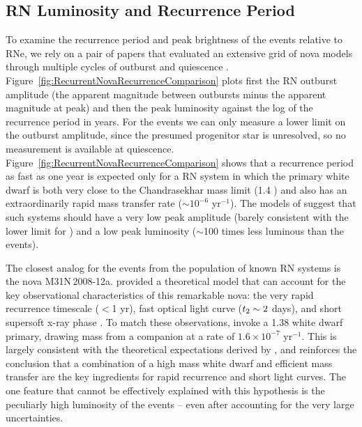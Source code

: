 \subsection{RN Luminosity and Recurrence Period}\label{sec:RNLuminosityRecurrence}

To examine the recurrence period and peak brightness of the \spock
events relative to RNe, we rely on a pair of papers that evaluated an
extensive grid of nova models through multiple cycles of outburst and
quiescence \citep{Prialnik:1995,Yaron:2005}.
Figure~\ref{fig:RecurrentNovaRecurrenceComparison} plots first the RN
outburst amplitude (the apparent magnitude between outbursts minus the
apparent magnitude at peak) and then the peak luminosity against the
log of the recurrence period in years.
For the \spock events we can only measure a lower limit on the
outburst amplitude, since the presumed progenitor star is unresolved,
so no measurement is available at
quiescence. Figure~\ref{fig:RecurrentNovaRecurrenceComparison} shows
that a recurrence period as fast as one year is expected only for a RN
system in which the primary white dwarf is both very close to the Chandrasekhar
mass limit (1.4 \Msun) and also has an extraordinarily rapid mass
transfer rate ($\sim10^{-6}$ \Msun yr$^{-1}$).  The models of
\citet{Yaron:2005} suggest that such systems should have a very low
peak amplitude (barely consistent with the lower limit for \spock) and
a low peak luminosity ($\sim$100 times less luminous than the \spock
events).

The closest analog for the \spock events from the population of known
RN systems is the nova M31N\,2008-12a.  \citet{Kato:2015} provided a
theoretical model that can account for the key observational
characteristics of this remarkable nova: the very rapid recurrence
timescale ($<$1 yr), fast optical light curve ($\t2\sim2$ days), and
short supersoft x-ray phase \citep[6-18 days after optical
  outburst][]{Henze:2015a}.  To match these observations,
\citeauthor{Kato:2015} invoke a 1.38 \Msun white dwarf primary,
drawing mass from a companion at a rate of $1.6\times10^{-7}$ \Msun
yr$^{-1}$.  This is largely consistent with the theoretical
expectations derived by \citet{Yaron:2005}, and reinforces the
conclusion that a combination of a high mass white dwarf and efficient
mass transfer are the key ingredients for rapid recurrence and short
light curves. The one feature that cannot be effectively explained
with this hypothesis is the peculiarly high luminosity of the \spock
events -- even after accounting for the very large uncertainties. 
